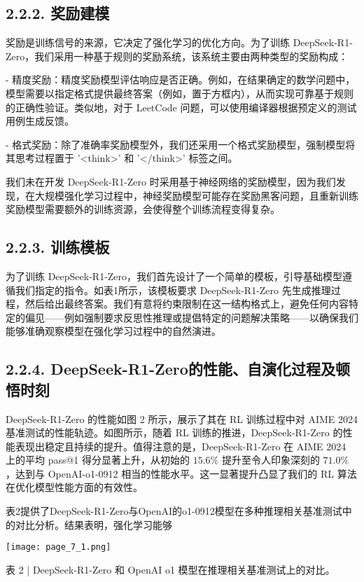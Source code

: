 \documentclass[12pt,a4paper]{report} %
\begin{document}
\subsection*{2.2.2. 奖励建模}


奖励是训练信号的来源，它决定了强化学习的优化方向。为了训练 DeepSeek-R1-Zero，我们采用一种基于规则的奖励系统，该系统主要由两种类型的奖励构成：


- 精度奖励：精度奖励模型评估响应是否正确。例如，在结果确定的数学问题中，模型需要以指定格式提供最终答案（例如，置于方框内），从而实现可靠基于规则的正确性验证。类似地，对于 LeetCode 问题，可以使用编译器根据预定义的测试用例生成反馈。


- 格式奖励：除了准确率奖励模型外，我们还采用一个格式奖励模型，强制模型将其思考过程置于 '\textless{}think\textgreater{}' 和 '\textless{}/think\textgreater{}' 标签之间。


我们未在开发 DeepSeek-R1-Zero 时采用基于神经网络的奖励模型，因为我们发现，在大规模强化学习过程中，神经奖励模型可能存在奖励黑客问题，且重新训练奖励模型需要额外的训练资源，会使得整个训练流程变得复杂。


\subsection*{2.2.3. 训练模板}


为了训练 DeepSeek-R1-Zero，我们首先设计了一个简单的模板，引导基础模型遵循我们指定的指令。如表1所示，该模板要求 DeepSeek-R1-Zero 先生成推理过程，然后给出最终答案。我们有意将约束限制在这一结构格式上，避免任何内容特定的偏见——例如强制要求反思性推理或提倡特定的问题解决策略——以确保我们能够准确观察模型在强化学习过程中的自然演进。


\subsection*{2.2.4. DeepSeek-R1-Zero的性能、自演化过程及顿悟时刻}


DeepSeek-R1-Zero 的性能如图 2 所示，展示了其在 RL 训练过程中对 AIME 2024 基准测试的性能轨迹。如图所示，随着 RL 训练的推进，DeepSeek-R1-Zero 的性能表现出稳定且持续的提升。值得注意的是，DeepSeek-R1-Zero 在 AIME 2024 上的平均 pass@1 得分显著上升，从初始的 $15.6 \%$ 提升至令人印象深刻的 $71.0 \%$，达到与 OpenAI-o1-0912 相当的性能水平。这一显著提升凸显了我们的 RL 算法在优化模型性能方面的有效性。


表2提供了DeepSeek-R1-Zero与OpenAI的o1-0912模型在多种推理相关基准测试中的对比分析。结果表明，强化学习能够
\begin{center}
\texttt{[image: page\_7\_1.png]}
\end{center}
\begin{center}
表 2 | DeepSeek-R1-Zero 和 OpenAI o1 模型在推理相关基准测试上的对比。
\end{center}
\end{document}
